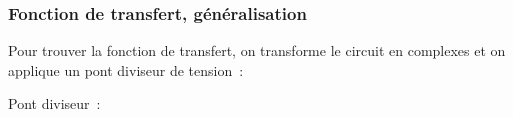\documentclass[../../main/main.tex]{subfiles}
\begin{document}
\subsubsection{Fonction de transfert, généralisation}
Pour trouver la fonction de transfert, on transforme le circuit en complexes et
on applique un pont diviseur de tension~:
\smallbreak
\noindent
\begin{minipage}[c]{.45\linewidth}
	\begin{center}
		\vspace{-15pt}
	\end{center}
\end{minipage}
\hfill
\begin{minipage}[c]{.5\linewidth}
	Pont diviseur~:
\end{minipage}
\end{document}
